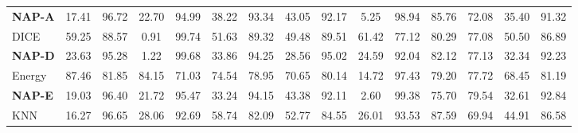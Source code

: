 \begin{table}[!h]
{\begin{tabular}{LcccccccccccccR}
\textbf{NAP-A}                                 & 17.41                     & 96.72                     & 22.70                     & 94.99                     & 38.22                     & 93.34                     & 43.05                     & 92.17                     & 5.25                      & 98.94                     & 85.76                     & 72.08                     & 35.40                     & 91.32                     \\
DICE                           & 59.25                      & 88.57                      & 0.91                      & 99.74                        & 51.63                      & 89.32                      & 49.48                      & 89.51                       & 61.42                      & 77.12                      & 80.29                      & 77.08                      & 50.50                      & 86.89                       \\
\textbf{NAP-D}            & 23.63                       & 95.28                      & 1.22                      & 99.68                      & 33.86                       & 94.25                      & 28.56                       & 95.02                      & 24.59                       & 92.04                      & 82.12                      & 77.13                      & 32.34                       & 92.23                      \\ %
Energy                                                & 87.46                     & 81.85                     & 84.15                     & 71.03                     & 74.54                     & 78.95                     & 70.65                     & 80.14                     & 14.72                     & 97.43                     & 79.20                     & 77.72                     & 68.45                     & 81.19                     \\
\textbf{NAP-E}                                 & 19.03                     & 96.40                     & 21.72                     & 95.47                     & 33.24                     & 94.15                     & 43.38                     & 92.11                     & 2.60                      & 99.38                     & 75.70                     & 79.54                     & 32.61                     & 92.84                     \\
KNN                           & 16.27                      & 96.65                      & 28.06                      & 92.69                      & 58.74                      & 82.09                      & 52.77                       & 84.55                      & 26.01                      & 93.53                      & 87.59                      & 69.94                      & 44.91                      & 86.58                      \\

\end{tabular}}
\end{table}
